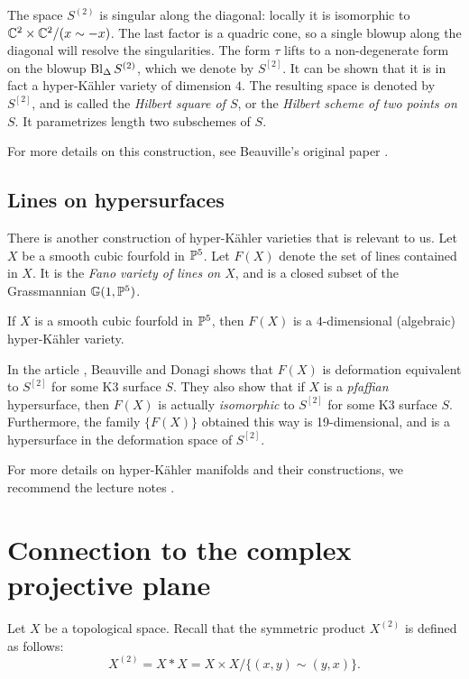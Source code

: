 The space $S^{(2)}$ is singular along the diagonal: locally it is isomorphic to $\C^2 \times \C^2 /(x \sim -x)$. The last factor is a quadric cone, so a single blowup along the diagonal will resolve the singularities. The form $\tau$ lifts to a non-degenerate form on the blowup $\Bl_\Delta S^{(2)}$, which we denote by $S^{[2]}$. It can be shown that it is in fact a hyper-Kähler variety of dimension $4$. The resulting space is denoted by $S^{[2]}$, and is called the \emph{Hilbert square of $S$}, or the \emph{Hilbert scheme of two points on $S$}. It parametrizes length two subschemes of $S$.

For more details on this construction, see Beauville's original paper \cite{beauville_hyperkahler}.

\subsection{Lines on hypersurfaces}

There is another construction of hyper-Kähler varieties that is relevant to us. Let $X$ be a smooth cubic fourfold in $\P^5$. Let $F(X)$ denote the set of lines contained in $X$. It is the \emph{Fano variety of lines on $X$}, and is a closed subset of the Grassmannian $\mathbb G(1,\P^5)$.

\begin{proposition}
If $X$ is a smooth cubic fourfold in $\P^5$, then $F(X)$ is a $4$-dimensional (algebraic) hyper-Kähler variety.
\end{proposition}

In the article \cite{beauville_donagi_fano}, Beauville and Donagi shows that $F(X)$ is deformation equivalent to $S^{[2]}$ for some K3 surface $S$. They also show that if $X$ is a \emph{pfaffian} hypersurface, then $F(X)$ is actually \emph{isomorphic} to $S^{[2]}$ for some K3 surface $S$. Furthermore, the family $\{ F(X) \}$  obtained this way is 19-dimensional, and is a hypersurface in the deformation space of $S^{[2]}$.

For more details on hyper-Kähler manifolds and their constructions, we recommend the lecture notes \cite{lehn_symplectic}.


\section{Connection to the complex projective plane}

Let $X$ be a topological space. Recall that the symmetric product $X^{(2)}$ is defined as follows:
\[
X^{(2)} = X \ast X = X \times X / \{ (x,y) \sim (y,x) \}.
\]

